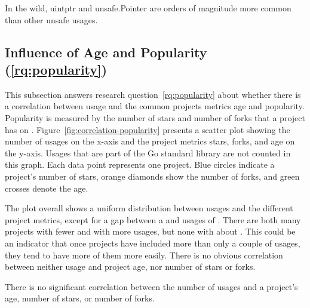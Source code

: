 
\begin{answerToRQ}[\ref{rq:distTypes}]
    In the wild, uintptr and unsafe.Pointer are orders of magnitude more common than other unsafe usages.
\end{answerToRQ}



\subsection{Influence of Age and Popularity (\ref{rq:popularity})}\label{subsec:go-geiger:evaluation:popularity}

This subsection answers research question~\ref{rq:popularity} about whether there is a correlation between \unsafe{}
usage and the common projects metrics age and popularity.
Popularity is measured by the number of stars and number of forks that a project has on \github{}.
Figure~\ref{fig:correlation-popularity} presents a scatter plot showing the number of \unsafe{} usages on the x-axis and
the project metrics stars, forks, and age on the y-axis.
Usages that are part of the Go standard library are not counted in this graph.
Each data point represents one project.
Blue circles indicate a project's number of stars, orange diamonds show the number of forks, and green crosses denote
the age.



The plot overall shows a uniform distribution between \unsafe{} usages and the different project metrics, except for
a gap between a  and  usages of \unsafe{}.
There are both many projects with fewer and with more usages, but none with about .
This could be an indicator that once projects have included more than only a couple of \unsafe{} usages, they tend to
have more of them more easily.
There is no obvious correlation between neither \unsafe{} usage and project age, nor number of stars or forks.

\begin{answerToRQ}[\ref{rq:popularity}]
    There is no significant correlation between the number of \unsafe{} usages and a project's age, number of stars, or
    number of forks.
\end{answerToRQ}



